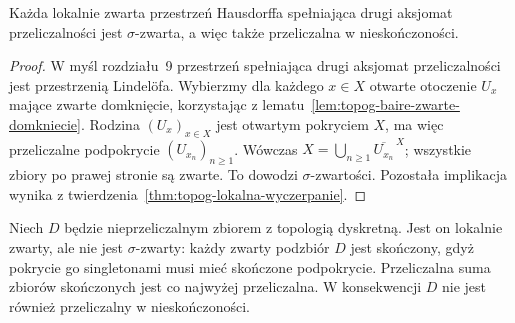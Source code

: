 \begin{stwierdzenie}
\label{prop:topog-lokalna-drugi-aksjomat}
Każda lokalnie zwarta przestrzeń Hausdorffa
spełniająca drugi aksjomat przeliczalności
jest $\sigma$-zwarta, a więc także
przeliczalna w nieskończoności.
\end{stwierdzenie}
\begin{proof}
W myśl rozdziału~9 przestrzeń
spełniająca drugi aksjomat przeliczalności
jest przestrzenią Lindelöfa.
Wybierzmy dla każdego $x\in X$
otwarte otoczenie $U_x$ mające zwarte
domknięcie, korzystając z
lematu~\ref{lem:topog-baire-zwarte-domkniecie}.
Rodzina $(U_x)_{x\in X}$ jest otwartym
pokryciem $X$, ma więc przeliczalne
podpokrycie $(U_{x_n})_{n\ge1}$.
Wówczas
$X=\bigcup_{n\ge1}\overline{U_{x_n}}^{\,X}$;
wszystkie zbiory po prawej stronie
są zwarte. To dowodzi $\sigma$-zwartości.
Pozostała implikacja wynika z
twierdzenia~\ref{thm:topog-lokalna-wyczerpanie}.
\end{proof}

\begin{przyklad}
\label{ex:topog-lokalna-dyskretna-nie-sigma}
Niech $D$ będzie nieprzeliczalnym
zbiorem z topologią dyskretną.
Jest on lokalnie zwarty, ale nie jest
$\sigma$-zwarty: każdy zwarty podzbiór
$D$ jest skończony, gdyż pokrycie go
singletonami musi mieć skończone podpokrycie.
Przeliczalna suma zbiorów skończonych
jest co najwyżej przeliczalna.
W konsekwencji $D$ nie jest również
przeliczalny w nieskończoności.
\end{przyklad}

